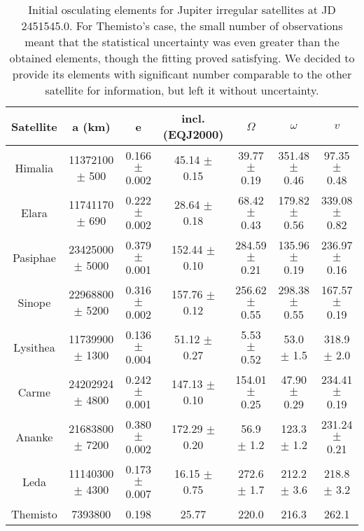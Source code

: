 \documentclass[traditabstract]{aa}
\begin{document}
\begin{table}
\caption{Initial osculating elements for Jupiter irregular satellites at JD 2451545.0. For Themisto's case, the small number of observations meant that the statistical uncertainty was even greater than the obtained elements, though the fitting proved satisfying. We decided to provide its elements with significant number comparable to the other satellite for information, but left it without uncertainty.  }\label{sat_ell}
\begin{center}
\begin{tabular}{ccccccc}
\hline\hline
Satellite & a (km) & e & incl. (EQJ2000) & $\Omega$ & $\omega$ & $v$ \\ 
\hline
Himalia &   11372100 $\pm$ 500    &    0.166 $\pm$ 0.002      &   45.14 $\pm$ 0.15      &   39.77 $\pm$ 0.19      &   351.48 $\pm$ 0.46      &   97.35 $\pm$ 0.48    \\
Elara &   11741170 $\pm$ 690  &      0.222 $\pm$ 0.002      &   28.64 $\pm$ 0.18      &   68.42 $\pm$ 0.43      &   179.82 $\pm$ 0.56      &   339.08 $\pm$ 0.82  \\
Pasiphae &  23425000  $\pm$ 5000    &     0.379  $\pm$ 0.001       &   152.44 $\pm$ 0.10      &   284.59 $\pm$ 0.21      &   135.96 $\pm$ 0.19      &   236.97 $\pm$ 0.16 \\
Sinope &   22968800 $\pm$ 5200   &     0.316 $\pm$ 0.002      &   157.76 $\pm$ 0.12      &   256.62 $\pm$ 0.55      &   298.38 $\pm$ 0.55      &   167.57 $\pm$ 0.19    \\
Lysithea &   11739900 $\pm$ 1300  &      0.136 $\pm$ 0.004      &    51.12 $\pm$ 0.27     &   5.53 $\pm$ 0.52      &   53.0 $\pm$ 1.5      &   318.9 $\pm$ 2.0   \\
Carme &   24202924 $\pm$ 4800      &  0.242 $\pm$ 0.001      &   147.13 $\pm$ 0.10      &   154.01 $\pm$ 0.25      &   47.90 $\pm$ 0.29      &   234.41 $\pm$ 0.19  \\
Ananke &  21683800  $\pm$ 7200  &     0.380 $\pm$ 0.002      &   172.29 $\pm$ 0.20      &   56.9 $\pm$ 1.2      &   123.3 $\pm$ 1.2      &   231.24 $\pm$ 0.21  \\
Leda &   11140300  $\pm$ 4300  &     0.173  $\pm$ 0.007     &   16.15  $\pm$ 0.75    &   272.6  $\pm$ 1.7    &   212.2  $\pm$ 3.6          &   218.8  $\pm$ 3.2  \\
Themisto  & 7393800    &     0.198       &   25.77  &   220.0     &   216.3    &   262.1     \\ \hline
\end{tabular} 

\end{center}
\end{table}
 
\end{document}
